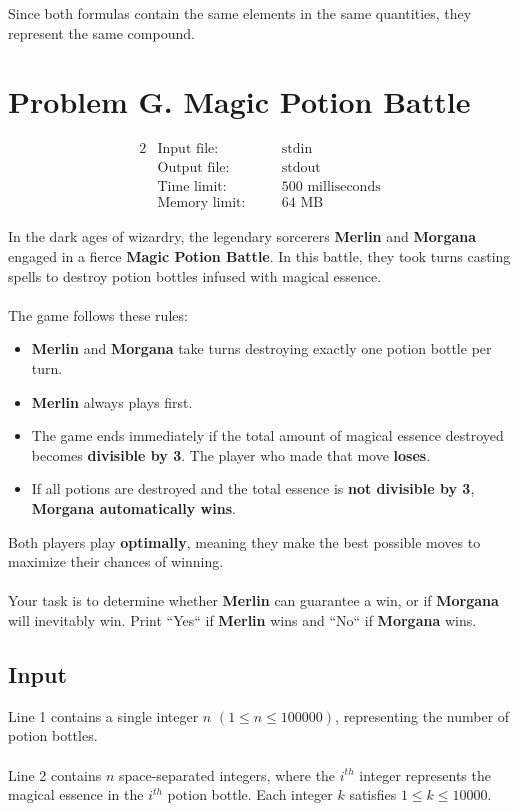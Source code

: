 \documentclass[12pt,a4paper]{article}
\begin{document}
Since both formulas contain the same elements in the same quantities, they represent the same compound.

\newpage

\section*{\fontsize{18}{12} Problem G. Magic Potion Battle}

\begin{alignat*} {2}
 &   \text{Input file:}   \quad     &&\text{stdin}\\
 &   \text{Output file:}  \quad     &&\text{stdout}\\
 &   \text{Time limit:}   \quad     &&\text{500 milliseconds}\\
 &   \text{Memory limit:} \quad     &&\text{64 MB}
\end{alignat*}

\noindent
In the dark ages of wizardry, the legendary sorcerers \textbf{Merlin} and \textbf{Morgana} engaged in a fierce \textbf{Magic Potion Battle}. In this battle, they took turns casting spells to destroy potion bottles infused with magical essence. 
\\\\
\noindent
The game follows these rules:
\begin{itemize}
    \item \textbf{Merlin} and \textbf{Morgana} take turns destroying exactly one potion bottle per turn.
    \item \textbf{Merlin} always plays first.
    \item The game ends immediately if the total amount of magical essence destroyed becomes \textbf{divisible by 3}. The player who made that move \textbf{loses}.
    \item If all potions are destroyed and the total essence is \textbf{not divisible by 3}, \textbf{Morgana automatically wins}.
\end{itemize}

\noindent
Both players play \textbf{optimally}, meaning they make the best possible moves to maximize their chances of winning. 
\\\\
\noindent
Your task is to determine whether \textbf{Merlin} can guarantee a win, or if \textbf{Morgana} will inevitably win. Print ``Yes`` if \textbf{Merlin} wins and ``No`` if \textbf{Morgana} wins.

\subsection*{\fontsize{16}{12}Input}
Line 1 contains a single integer \( n \) \((1 \leq n \leq 100000)\), representing the number of potion bottles.
\\\\
\noindent
Line 2 contains \( n \) space-separated integers, where the \( i^{th} \) integer represents the magical essence in the \( i^{th} \) potion bottle. Each integer \( k \) satisfies \( 1 \leq k \leq 10000 \).
\end{document}
